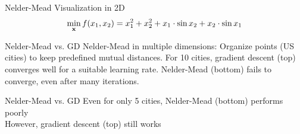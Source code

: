 \documentclass[11pt,compress,t,notes=noshow, xcolor=table]{beamer}
\begin{document}
\begin{frame2}{Nelder-Mead Visualization in 2D}
$$\min_{\mathbf{x}} f(x_1,x_2) = x_1^{2} + x_2^{2} + x_1\cdot \sin x_2 + x_2 \cdot \sin x_1 $$ 
\end{frame2}

\begin{frame2}{Nelder-Mead vs. GD}
{\footnotesize Nelder-Mead in multiple dimensions:
Organize points (US cities) to keep predefined mutual distances.
For 10 cities, gradient descent (top) converges well for a suitable learning rate.
Nelder-Mead (bottom) fails to converge, even after many iterations.}
\end{frame2}

\begin{frame2}{Nelder-Mead vs. GD}
{\footnotesize Even for only 5 cities, Nelder-Mead (bottom) performs poorly\\
However, gradient descent (top) still works}
\end{frame2}


\endlecture
\end{document}
